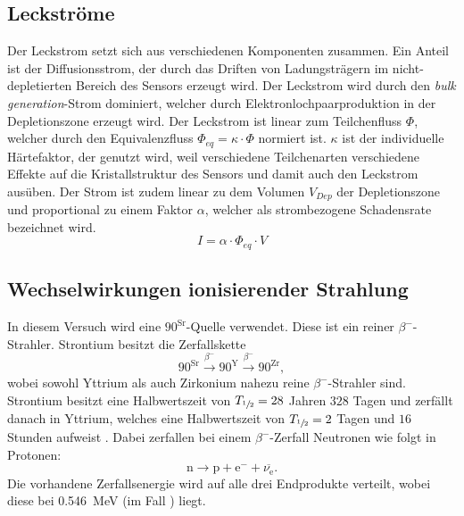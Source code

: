 \subsection{Leckströme}
Der Leckstrom setzt sich aus verschiedenen Komponenten zusammen. Ein Anteil ist der Diffusionsstrom, der durch das Driften von Ladungsträgern im nicht-depletierten Bereich des Sensors erzeugt wird. Der Leckstrom wird durch den \textit{bulk generation}-Strom dominiert, welcher durch Elektronlochpaarproduktion in der Depletionszone erzeugt wird. Der Leckstrom ist linear zum Teilchenfluss $\Phi$, welcher durch den Equivalenzfluss $\Phi_{eq} = \kappa \cdot \Phi$ normiert ist. $\kappa$ ist der individuelle Härtefaktor, der genutzt wird, weil verschiedene Teilchenarten verschiedene Effekte auf die Kristallstruktur des Sensors und damit auch den Leckstrom ausüben.  Der Strom ist zudem linear zu dem Volumen $V_{Dep}$ der Depletionszone und proportional zu einem Faktor $\alpha$, welcher als strombezogene Schadensrate bezeichnet wird.
\begin{equation}
	I = \alpha \cdot \Phi_{eq} \cdot V
\end{equation}

\subsection{Wechselwirkungen ionisierender Strahlung}
In diesem Versuch wird eine ${90}^\text{Sr}$-Quelle verwendet. Diese ist ein reiner $\beta^{-}$-Strahler. Strontium besitzt die Zerfallskette
\begin{equation*}
  {90}^\text{Sr} \stackrel{\beta^{-}}{\longrightarrow} {90}^\text{Y}
  \stackrel{\beta^{-}}{\longrightarrow} {90}^\text{Zr},
\end{equation*}
wobei sowohl Yttrium als auch Zirkonium nahezu reine $\beta^{-}$-Strahler sind. Strontium besitzt eine Halbwertszeit von $T_{\sfrac{1}{2}} = 28$ Jahren $328$ Tagen und zerfällt danach in Yttrium, welches eine Halbwertszeit von $T_{\sfrac{1}{2}} = 2$ Tagen und $16$ Stunden aufweist \cite{periodensystem}. Dabei zerfallen bei einem $\beta^{-}$-Zerfall Neutronen wie folgt in Protonen:
\begin{equation*}
  \text{n} \rightarrow \text{p} + \text{e}^{-} + \overline{\nu_\text{e}}.
\end{equation*}
Die vorhandene Zerfallsenergie wird auf alle drei Endprodukte verteilt, wobei diese bei \SI{0.546}{\mega\electronvolt} (im Fall ) liegt.

